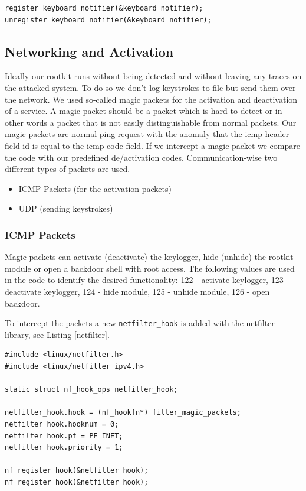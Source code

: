 \documentclass[12pt]{article}
\begin{document}
\begin{lstlisting}[caption=Register Keyboard, label=registerKeyboard]
register_keyboard_notifier(&keyboard_notifier);
unregister_keyboard_notifier(&keyboard_notifier);
\end{lstlisting}



\subsection{Networking and Activation}
Ideally our rootkit runs without being detected and without leaving any traces on the attacked system. To do so we don't log keystrokes to file but send them over the network. We used so-called magic packets for the activation and deactivation of a service. A magic packet should be a packet which is hard to detect or in other words a packet that is not easily distinguishable from normal packets. Our magic packets are normal ping request with the anomaly that the icmp header field id is equal to the icmp code field. If we intercept a magic packet we compare the code with our predefined de/activation codes.
\label{sec:magicpackage}
\newline Communication-wise two different types of packets are used.
\begin{itemize}
	\item ICMP Packets (for the activation packets)
	\item UDP (sending keystrokes)
\end{itemize}
\subsubsection{ICMP Packets}
Magic packets can activate (deactivate) the keylogger, hide (unhide) the rootkit module or open a backdoor shell with root access. The following values are used in the code to identify the desired functionality: 122 - activate keylogger, 123 - deactivate keylogger, 124 - hide module, 125 - unhide module, 126 - open backdoor.

To intercept the packets a new \lstinline{netfilter_hook} is added with the netfilter library, see Listing \ref{netfilter}. \cite{f7}
\begin{lstlisting}[caption=Netfilter Hook, label=netfilter]
#include <linux/netfilter.h>
#include <linux/netfilter_ipv4.h>

static struct nf_hook_ops netfilter_hook;

netfilter_hook.hook = (nf_hookfn*) filter_magic_packets;
netfilter_hook.hooknum = 0;
netfilter_hook.pf = PF_INET;
netfilter_hook.priority = 1;

nf_register_hook(&netfilter_hook);
nf_register_hook(&netfilter_hook);
\end{lstlisting}
\end{document}

